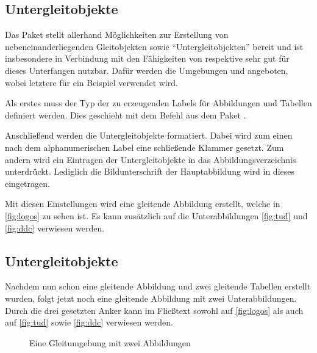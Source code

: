 \documentclass[%
  english,ngerman,%
  geometry=no,DIV=12,automark,%
]{tudscrartcl}
\begin{document}
\subsection{Untergleitobjekte}
\label{sec:subfloats}
Das Paket  stellt allerhand Möglichkeiten zur Erstellung von 
nebeneinanderliegenden Gleitobjekten sowie \enquote{Untergleitobjekten} bereit 
und ist insbesondere in Verbindung mit den Fähigkeiten von  
respektive  sehr gut für dieses Unterfangen nutzbar. Dafür 
werden die Umgebungen  und  
angeboten, wobei letztere für ein Beispiel verwendet wird.

Als erstes muss der Typ der zu erzeugenden Labels für Abbildungen und Tabellen 
definiert werden. Dies geschieht mit dem Befehl  
aus dem Paket .
%
\begin{Preamble}
\end{Preamble}
%
Anschließend werden die Untergleitobjekte formatiert. Dabei wird zum einen nach 
dem alphanumerischen Label eine schließende Klammer gesetzt. Zum andern wird 
ein Eintragen der Untergleitobjekte in das Abbildungsverzeichnis unterdrückt. 
Lediglich die Bildunterschrift der Hauptabbildung wird in dieses eingetragen.
%
\begin{Preamble*}
\captionsetup[subfloat]{labelformat=brace,list=off}
\end{Preamble*}
%
Mit diesen Einstellungen wird eine gleitende Abbildung erstellt, welche in 
\autoref{fig:logos} zu sehen ist. Es kann zusätzlich auf die Unterabbildungen 
\autoref{fig:tud} und \autoref{fig:ddc} verwiesen werden.
%
\begin{Trunk+}
\subsection{Untergleitobjekte}
Nachdem nun schon eine gleitende Abbildung und zwei gleitende Tabellen 
erstellt wurden, folgt jetzt noch eine gleitende Abbildung mit zwei 
Unterabbildungen. Durch die drei gesetzten Anker kann im Fließtext 
sowohl auf \autoref{fig:logos} als auch auf \autoref{fig:tud} sowie 
\autoref{fig:ddc} verwiesen werden.

\end{Trunk+}
\begin{Trunk}
\begin{figure}
%
  {\caption{Eine Gleitumgebung mit zwei Abbildungen}\label{fig:logos}}%
\end{figure}

\end{Trunk}
\InputCode
\end{document}
